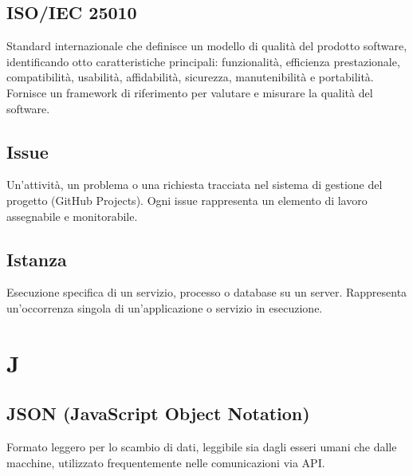 \documentclass[a4paper, 11pt, oneside]{scrartcl} %
\begin{document}
\subsection*{ISO/IEC 25010}
Standard internazionale che definisce un modello di qualità del prodotto software, identificando otto caratteristiche principali: funzionalità, efficienza prestazionale, compatibilità, usabilità, affidabilità, sicurezza, manutenibilità e portabilità. Fornisce un framework di riferimento per valutare e misurare la qualità del software.
\vspace{0.5cm}

\subsection*{Issue}


Un'attività, un problema o una richiesta tracciata nel sistema di gestione del progetto (GitHub Projects). Ogni issue rappresenta un elemento di lavoro assegnabile e monitorabile.

\vspace{0.5cm}

\subsection*{Istanza}


Esecuzione specifica di un servizio, processo o database su un server. Rappresenta un'occorrenza singola di un'applicazione o servizio in esecuzione.

\vspace{0.5cm}



\section*{J}


\subsection*{JSON (JavaScript Object Notation)}
Formato leggero per lo scambio di dati, leggibile sia dagli esseri umani che dalle macchine, utilizzato frequentemente nelle comunicazioni via API.
\vspace{0.5cm}
\end{document}
